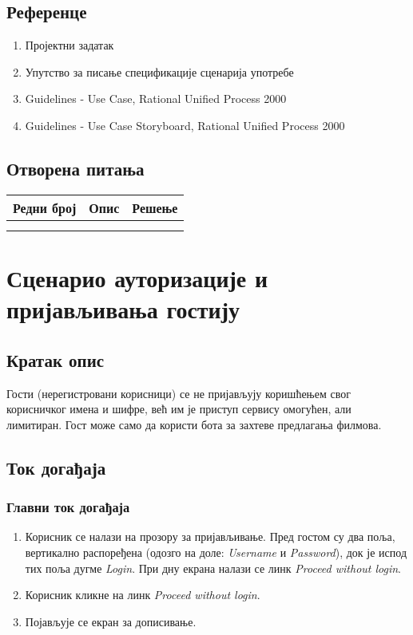 \documentclass[12pt,a4paper]{article}
\begin{document}
\subsection{Референце}
 
\begin{enumerate}
  \item Пројектни задатак
  \item Упутство за писање спецификације сценарија употребе
  \item Guidelines - Use Case, Rational Unified Process 2000
  \item Guidelines - Use Case Storyboard, Rational Unified Process 2000
\end{enumerate}

\subsection{Отворена питања}

\noindent
\setcellgapes{4pt}
\makegapedcells
\begin{tabularx}{\linewidth}{|l|X|X|}
    \hline
    \textbf{Редни број} & \textbf{Опис} & \textbf{Решење} \\
    \hline
    & &  \\
    \hline
    & &  \\
    \hline
\end{tabularx}
\section{Сценарио ауторизације и пријављивања гостију }
\subsection{Кратак опис}

Гости (нерегистровани корисници) се не пријављују коришћењем свог корисничког имена и шифре, већ им је приступ
сервису омогућен, али лимитиран. Гост може само да користи бота за захтеве предлагања филмова.

\subsection{Ток догађаја}

   \subsubsection{Главни ток догађаја} 
 \begin{enumerate}
        \item {Корисник се налази на прозору за пријављивање.}\newline
          Пред гостом су два поља, вертикално распоређена (одозго на доле:  \textit{Username} и \textit{Password}), док је испод тих поља дугме \textit{Login}. При дну екрана налази се линк  \textit{Proceed without login}.
        \item {Корисник кликне на линк \textit{Proceed without login}.}
        \item {Појављује се екран за дописивање.}
   
\end{enumerate}
\end{document}
